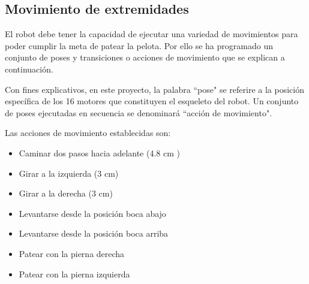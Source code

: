 

\subsection{Movimiento de extremidades}\label{esqueleto}

El robot debe tener la capacidad de ejecutar una variedad de movimientos para poder cumplir la meta de patear la pelota. Por ello se ha programado un conjunto de poses y transiciones o acciones de movimiento que se explican a continuación.

Con fines explicativos, en este proyecto, la palabra ``pose" se referire a la posición específica de los 16 motores que constituyen el esqueleto del robot. Un conjunto de poses ejecutadas en secuencia se denominará ``acción de movimiento".

Las acciones de movimiento establecidas son:

\begin{itemize}
 \item {Caminar dos pasos hacia adelante (4.8 cm ) }
 \item {Girar a la izquierda (3 cm)}
 \item {Girar a la derecha (3 cm)}
 \item {Levantarse desde la posición boca abajo}
 \item {Levantarse desde la posición boca arriba}
 \item {Patear con la pierna derecha }
 \item {Patear con la pierna izquierda}
 
\end{itemize}

